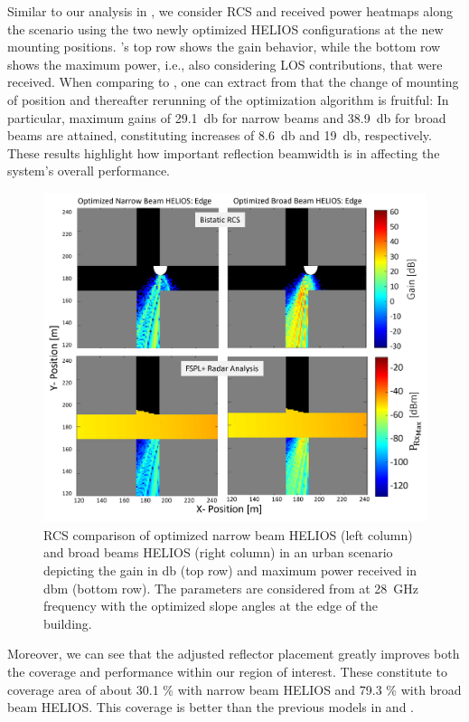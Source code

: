 Similar to our analysis in , we consider RCS and received power heatmaps along the scenario using the two newly optimized HELIOS configurations at the new mounting positions. 's top row shows the gain behavior, while the bottom row shows the maximum power, i.e., also considering LOS contributions, that were received. When comparing to , one can extract from  that the change of mounting of position and thereafter rerunning of the optimization algorithm is fruitful: In particular, maximum gains of \SI{29.1}{\decibel} for narrow beams and \SI{38.9}{\decibel} for broad beams are attained, constituting increases of \SI{8.6}{\decibel} and \SI{19}{\decibel}, respectively. These results highlight how important reflection beamwidth is in affecting the system's overall performance.

\begin{figure}[tb]
	\centering
	\includegraphics[width=0.8\linewidth]{images/Section 4 Images/urbanscenario_edgevalues}
	\caption{RCS comparison of optimized narrow beam HELIOS (left column) and broad beams HELIOS (right column) in an urban scenario depicting the gain in \si{\decibel} (top row) and maximum power received in \si{\decibel}m (bottom row). The parameters are considered from  at \SI{28}{\giga\hertz} frequency with the optimized slope angles at the edge of the building.}
	\label{fig:urbanscenario_edgevalues}
\end{figure}
Moreover, we can see that the adjusted reflector placement greatly improves both the coverage and performance within our region of interest. These constitute to coverage area of about \num{30.1} \% with narrow beam HELIOS and \num{79.3} \% with broad beam HELIOS. This coverage is better than the previous models in  and .

